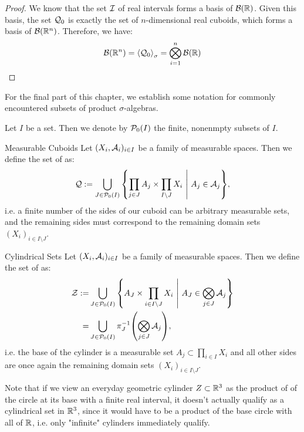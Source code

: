 \begin{proof}
	We know that the set $\mathcal{I}$ of real intervals forms a basis of $\mathcal{B}(\mathbb{R})$. Given this basis, the set $\mathcal{Q}_0$ is exactly the set of $n$-dimensional real cuboids, which forms a basis of $\mathcal{B}(\mathbb{R}^n)$. Therefore, we have:
	\begin{align*}
		\mathcal{B}(\mathbb{R}^n)
		= \left\langle \mathcal{Q}_0 \right\rangle_\sigma 
		= \bigotimes_{i = 1}^n \mathcal{B}(\mathbb{R})
	\end{align*}
\end{proof}
For the final part of this chapter, we establish some notation for commonly encountered subsets of product $\sigma$-algebras.
\begin{definition}
	Let $I$ be a set. Then we denote by $\mathcal{P}_0(I)$ the finite, nonenmpty subsets of $I$.
\end{definition}
\begin{importantdefinition}{Measurable Cuboids}{}
	Let $(X_i, \mathcal{A}_i)_{i \in I}$ be a family of measurable spaces. Then we define the set of  as:
	\begin{align*}
		\mathcal{Q} := \bigcup_{J \in \mathcal{P}_0(I)} \qty{\prod_{j \in J} A_j \times \prod_{I \setminus J} X_i ~\middle|~A_j \in \mathcal{A}_j},
	\end{align*}
	i.e. a finite number of the sides of our cuboid can be arbitrary measurable sets, and the remaining sides must correspond to the remaining domain sets $(X_i)_{i \in I \setminus J}$.
\end{importantdefinition}
\begin{importantdefinition}{Cylindrical Sets}{}
	Let $(X_i, \mathcal{A}_i)_{i \in I}$ be a family of measurable spaces. Then we define the set of  as:
	\begin{align*}
		\mathcal{Z} :=
		&\bigcup_{J \in \mathcal{P}_0(I)} \qty{A_J \times \prod_{i \in I \setminus J} X_i
			~\middle|~A_J \in \bigotimes_{j \in J} \mathcal{A}_j}\\
		=
		&\bigcup_{J \in \mathcal{P}_0(I)}
		\pi_J^{-1}\qty(\bigotimes_{j \in J} \mathcal{A}_j),
	\end{align*}
	i.e. the base of the cylinder is a measurable set $A_j \subset \prod_{i \in I} X_i$ and all other sides are once again the remaining domain sets $(X_i)_{i \in I \setminus J}$.
\end{importantdefinition}
Note that if we view an everyday geometric cylinder $Z \subset \mathbb{R}^3$ as the product of of the circle at its base with a finite real interval, it doesn't actually qualify as a cylindrical set in $\mathbb{R}^3$, since it would have to be a product of the base circle with all of $\mathbb{R}$, i.e. only "infinite" cylinders immediately qualify.

